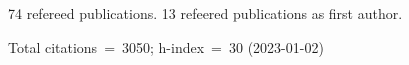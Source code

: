 74 refereed publications. 13 refeered publications as first author.

Total citations~=~3050; h-index~=~30 (2023-01-02)